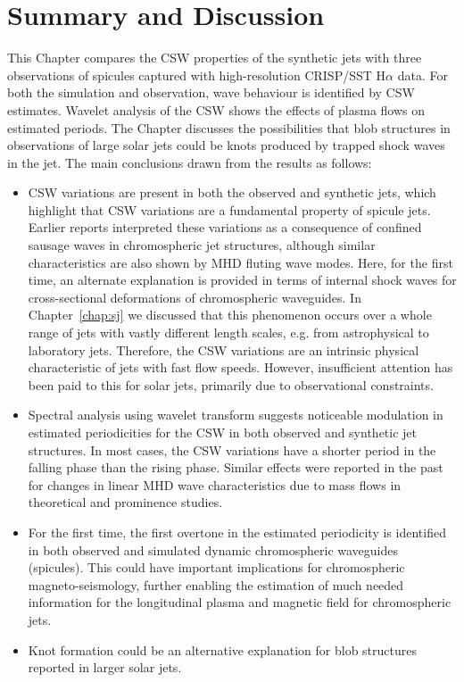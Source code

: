 \section{Summary and Discussion}
\label{sec:sum}
This Chapter compares the CSW properties of the synthetic jets with three observations of spicules captured with high-resolution CRISP/SST H$\alpha$ data. For both the simulation and observation, wave behaviour is identified by CSW estimates. Wavelet analysis of the CSW shows the effects of plasma flows on estimated periods. The Chapter discusses the possibilities that blob structures in observations of large solar jets could be knots produced by trapped shock waves in the jet. The main conclusions drawn from the results as follows:
\begin{itemize}
    \item{CSW variations are present in both the observed and synthetic jets, which highlight that CSW variations are a fundamental property of spicule jets. Earlier reports interpreted these variations as a consequence of confined sausage waves in chromospheric jet structures, although similar characteristics are also shown by MHD fluting wave modes. Here, for the first time, an alternate explanation is provided in terms of internal shock waves for cross-sectional deformations of chromospheric waveguides. In Chapter~\ref{chap:sj} we discussed that this phenomenon occurs over a whole range of jets with vastly different length scales, e.g. from astrophysical to laboratory jets. Therefore, the CSW variations are an intrinsic physical characteristic of jets with fast flow speeds. However, insufficient attention has been paid to this for solar jets, primarily due to observational constraints.}    

    \item{Spectral analysis using wavelet transform suggests noticeable modulation in estimated periodicities for the CSW in both observed and synthetic jet structures. In most cases, the CSW variations have a shorter period in the falling phase than the rising phase. Similar effects were reported in the past for changes in linear MHD wave characteristics due to mass flows in theoretical and prominence studies.}

    \item{For the first time, the first overtone in the estimated periodicity is identified in both observed and simulated dynamic chromospheric waveguides (spicules). This could have important implications for chromospheric magneto-seismology, further enabling the estimation of much needed information for the longitudinal plasma and magnetic field for chromospheric jets.}
    
    \item{Knot formation could be an alternative explanation for blob structures reported in larger solar jets.}
\end{itemize}
